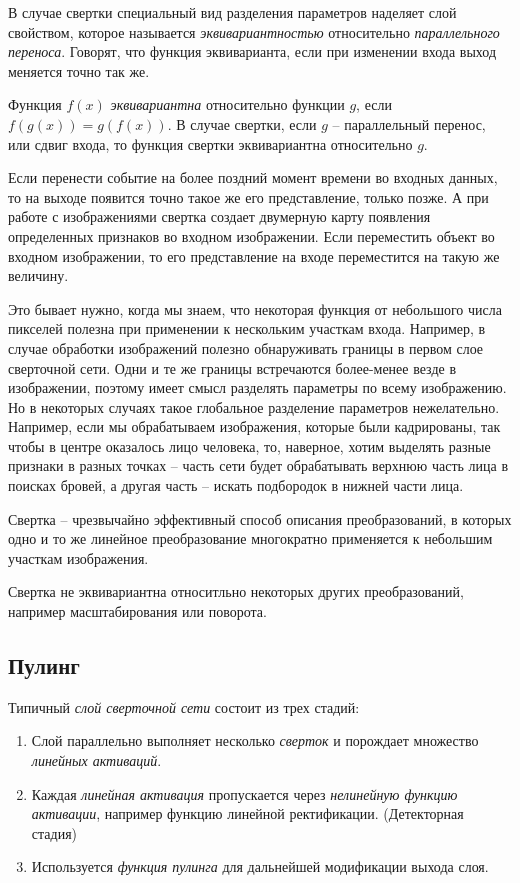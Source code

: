 \documentclass[%
	11pt,
	a4paper,
	utf8,
]{article}
\begin{document}
В случае свертки специальный вид разделения параметров наделяет слой свойством, которое называется \emph{эквивариантностью} относительно \emph{параллельного переноса}. Говорят, что функция эквиварианта, если при изменении входа выход меняется точно так же. 

Функция $ f(x) $ \emph{эквивариантна} относительно функции $ g $, если $ f(g(x)) = g(f(x)) $. В случае свертки, если $ g $ -- параллельный перенос, или сдвиг входа, то функция свертки эквивариантна относительно $ g $.

Если перенести событие на более поздний момент времени во входных данных, то на выходе появится точно такое же его представление, только позже. А при работе с изображениями свертка создает двумерную карту появления определенных признаков во входном изображении. Если переместить объект во входном изображении, то его представление на входе переместится на такую же величину.

{\color{blue}Это бывает нужно, когда мы знаем, что некоторая функция от небольшого числа пикселей полезна при применении к нескольким участкам входа.} Например, в случае обработки изображений полезно обнаруживать границы в первом слое сверточной сети. Одни и те же границы встречаются более-менее везде в изображении, поэтому имеет смысл разделять параметры по всему изображению. Но в некоторых случаях такое глобальное разделение параметров нежелательно. Например, если мы обрабатываем изображения, которые были кадрированы, так чтобы в центре оказалось лицо человека, то, наверное, хотим выделять разные признаки в разных точках -- часть сети будет обрабатывать верхнюю часть лица в поисках бровей, а другая часть -- искать подбородок в нижней части лица.

Свертка -- чрезвычайно эффективный способ описания преобразований, в которых одно и то же линейное преобразование многократно применяется к небольшим участкам изображения.

Свертка не эквивариантна относитльно некоторых других преобразований, например масштабирования или поворота.

\subsection{Пулинг}

Типичный \emph{слой сверточной сети} состоит из трех стадий:
\begin{enumerate}
	\item Слой параллельно выполняет несколько \emph{сверток} и порождает множество \emph{линейных активаций}.
	
	\item Каждая \emph{линейная активация} пропускается через \emph{нелинейную функцию активации}, например функцию линейной ректификации. (Детекторная стадия)
	
	\item Используется \emph{функция пулинга} для дальнейшей модификации выхода слоя.
\end{enumerate}
\end{document}
